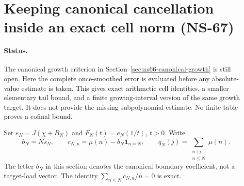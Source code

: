\section{Keeping canonical cancellation inside an exact cell norm (NS-67)}
\label{sec:ns67-canonical-cells}

\paragraph{Status.}
The canonical growth criterion in Section~\ref{sec:ns66-canonical-growth}
is still open. Here the complete once-smoothed error is evaluated before
any absolute-value estimate is taken. This gives exact arithmetic cell
identities, a smaller elementary tail bound, and a finite growing-interval
version of the same growth target. It does not provide the missing
subpolynomial estimate. No finite table proves a cofinal bound.

Set $e_N=J(\chi+B_N)$ and $F_N(t)=e_N(1/t)$, $t>0$.
Write
\[
 b_N=Ns_N,\qquad c_{N,n}=\mu(n)-b_N\mathbf1_{n=N},\qquad
 q_N(j)=\sum_{\substack{n\mid j\\n\leq N}}\mu(n).
\]
The letter $b_N$ in this section denotes the canonical boundary
coefficient, not a target-load vector. The identity
$\sum_{n\leq N}c_{N,n}/n=0$ is exact.

